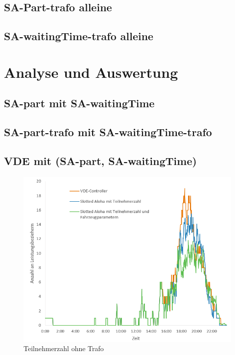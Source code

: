 \subsection{SA-Part-trafo alleine}
\subsection{SA-waitingTime-trafo alleine}
\section{Analyse und Auswertung}
\subsection{SA-part mit SA-waitingTime}
\subsection{SA-part-trafo mit SA-waitingTime-trafo}
\subsection{VDE mit (SA-part, SA-waitingTime)}
\begin{figure}[htb]
\centering
	\includegraphics[scale=0.7]{img/ohneTrafo/Teilnehmer2.png}
	\caption{Teilnehmerzahl ohne Trafo}
	\label{Abb_oTTeilnehmer}
\end{figure}

